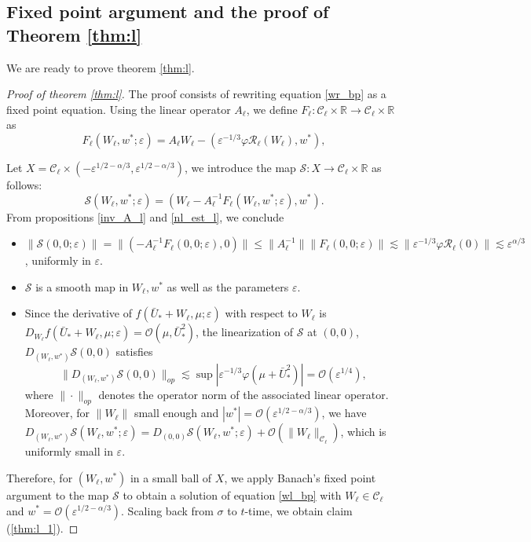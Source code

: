 \documentclass[letterpaper,11pt]{article}
\newcommand{\Ral}{\mathcal{R}}
\newcommand{\rmO}{\mathcal{O}}
\newcommand{\eps}{\varepsilon}
\newcommand{\lar}{ \lesssim }
\numberwithin{equation}{section}
\theoremstyle{plain}
\begin{document}
\subsection{Fixed point argument and the proof of Theorem \ref{thm:l}}
We are ready to prove theorem \ref{thm:l}.
\begin{proof}[Proof of theorem \ref{thm:l}]
The proof consists of rewriting equation \eqref{wr_bp} as a fixed point equation. Using the linear operator $A_\ell$, we define
$F_\ell : \mathcal{C}_\ell \times \mathbb{R} \to \mathcal{C}_\ell \times \mathbb{R}$ as
\[
F_\ell(W_\ell, w^*; \eps) = A_\ell W_\ell - (\eps^{-1/3}\varphi \Ral_\ell(W_\ell), w^*),
\]

Let $X = \mathcal{C}_\ell \times (-\eps^{1/2-\alpha/3},\eps^{1/2-\alpha/3})$, we introduce the map $\mathcal{S}: X \to \mathcal{C}_\ell\times \mathbb{R}$ as follows:
\[
\mathcal{S}(W_\ell,w^*; \eps) = (W_\ell-A_\ell^{-1}F_\ell(W_\ell,w^*;\eps), w^*).
\]
From propositions \ref{inv_A_l} and \ref{nl_est_l}, we conclude 
\begin{itemize}
\item $\|\mathcal{S}(0,0;\eps) \|= \|\left( -A_\ell^{-1}F_\ell(0,0;\eps),0\right)\| \le \|A_\ell^{-1}\|\|F_\ell(0,0;\eps)\| \lar \|\eps^{-1/3}\varphi \Ral_\ell(0)\| \lar \eps^{\alpha/3}$, uniformly in $\eps$.

\item $\mathcal{S}$ is a smooth map in $W_\ell,w^*$ as well as the parameters $\eps$.

\item Since the derivative of $f(\bar{U}_*+W_\ell,\mu;\eps)$ with respect to $W_\ell$ is $D_{W_\ell} f(\bar{U}_*+W_\ell,\mu;\eps)=\rmO(\mu, \bar{U}_*^2)$, the linearization of $\mathcal{S}$ at $(0,0)$, $D_{(W_\ell,w^*)} \mathcal{S}(0,0)$ satisfies
\[
\|D_{(W_\ell,w^*)} \mathcal{S}(0,0)\|_{op} \lar \sup|\eps^{-1/3}\varphi(\mu+\bar{U}_*^2)| = \rmO(\eps^{1/4}),
\]
where $\|\cdot\|_{op}$ denotes the operator norm of the associated linear operator.
Moreover, for $\|W_{\ell}\|$ small enough and $|w^*| =\rmO(\eps^{1/2-\alpha/3})$, we have $D_{(W_\ell,w^*)}\mathcal{S}(W_\ell,w^*;\eps) =  D_{(0, 0)}\mathcal{S}(W_\ell,w^*;\eps)+\rmO(\|W_\ell\|_{\mathcal{C}_\ell})$, which is uniformly small in $\eps$.
\end{itemize}

Therefore, for $(W_\ell, w^*)$ in a small ball of $X$, we apply Banach's fixed point argument to the map $\mathcal{S}$ to obtain a solution of equation \eqref{wl_bp} with $W_\ell \in \mathcal{C}_\ell$ and $w^* = \rmO(\eps^{1/2-\alpha/3})$. Scaling back from $\sigma$ to $t$-time, we obtain claim (\ref{thm:l_1}).
\end{proof}
\end{document}
